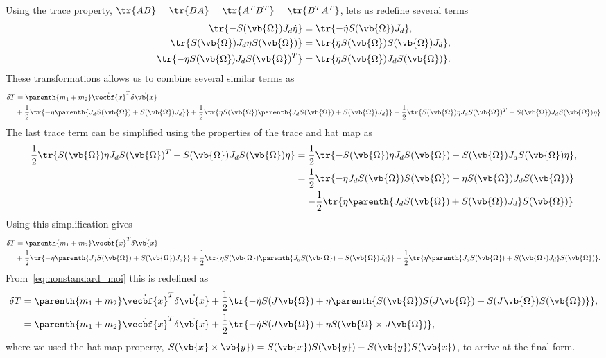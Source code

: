 \documentclass[11pt, reqno]{article}    %
\begin{document}
Using the trace property, \( \tr{AB} = \tr{BA} = \tr{A^T B^T} = \tr{B^T A^T} \), lets us redefine several terms
\begin{align*}
    \tr{-S(\vb{\Omega}) J_d \dot{\eta}} &= \tr{- \dot{\eta} S(\vb{\Omega}) J_d} , \\
    \tr{S(\vb{\Omega}) J_d \eta S(\vb{\Omega})} &= \tr{\eta S(\vb{\Omega}) S(\vb{\Omega}) J_d} , \\
    \tr{-\eta S(\vb{\Omega}) J_d S(\vb{\Omega})^T} &= \tr{\eta S(\vb{\Omega}) J_d S(\vb{\Omega})} .
\end{align*}
These transformations allows us to combine several similar terms as
\begin{align*}
    \delta T &= \parenth{m_1 + m_2} \dot{\vecbf{x}}^T \delta \dot{\vb{x}} \\
    & + \frac{1}{2} \tr{-\dot{\eta} \parenth{J_d S(\vb{\Omega}) + S(\vb{\Omega}) J_d}} + \frac{1}{2} \tr{\eta S(\vb{\Omega}) \parenth{J_d S(\vb{\Omega}) + S(\vb{\Omega}) J_d}} + \frac{1}{2} \tr{ S(\vb{\Omega}) \eta J_d S(\vb{\Omega})^T - S(\vb{\Omega}) J_d S(\vb{\Omega}) \eta}
\end{align*}
The last trace term can be simplified using the properties of the trace and hat map as
\begin{align*}
    \frac{1}{2} \tr{ S(\vb{\Omega}) \eta J_d S(\vb{\Omega})^T - S(\vb{\Omega}) J_d S(\vb{\Omega}) \eta} &= \frac{1}{2} \tr{ - S(\vb{\Omega}) \eta J_d S(\vb{\Omega}) - S(\vb{\Omega}) J_d S(\vb{\Omega}) \eta} , \\
    &= \frac{1}{2} \tr{ -  \eta J_d S(\vb{\Omega}) S(\vb{\Omega}) - \eta S(\vb{\Omega}) J_d S(\vb{\Omega}) } \\
    &= -\frac{1}{2} \tr{\eta \parenth{J_d S(\vb{\Omega}) +S(\vb{\Omega}) J_d }S(\vb{\Omega})}
\end{align*}
Using this simplification gives
\begin{align*}
    \delta T &= \parenth{m_1 + m_2} \dot{\vecbf{x}}^T \delta \dot{\vb{x}} \\
    & + \frac{1}{2} \tr{-\dot{\eta} \parenth{J_d S(\vb{\Omega}) + S(\vb{\Omega}) J_d}} + \frac{1}{2} \tr{\eta S(\vb{\Omega}) \parenth{J_d S(\vb{\Omega}) + S(\vb{\Omega}) J_d}} - \frac{1}{2} \tr{ \eta \parenth{J_d S(\vb{\Omega}) +S(\vb{\Omega}) J_d }S(\vb{\Omega})} .
\end{align*}
From~\cref{eq:nonstandard_moi} this is redefined as
\begin{align}\label{eq:kinetic_energy_variation_final}
    \delta T &= \parenth{m_1 + m_2} \dot{\vecbf{x}}^T \delta \dot{\vb{x}} + \frac{1}{2} \tr{-\dot \eta S(J \vb{\Omega}) + \eta \parenth{ S(\vb{\Omega}) S(J \vb{\Omega}) + S(J \vb{\Omega}) S(\vb{\Omega})} } , \nonumber\\
    &=  \parenth{m_1 + m_2} \dot{\vecbf{x}}^T \delta \dot{\vb{x}} + \frac{1}{2} \tr{ - \dot{\eta} S(J \vb{\Omega}) + \eta S(\vb{\Omega} \times J \vb{\Omega})} , 
\end{align}
where we used the hat map property, \( S(\vb{x} \times \vb{y}) = S(\vb{x})S(\vb{y}) - S(\vb{y})S(\vb{x}) \), to arrive at the final form.
\end{document}
